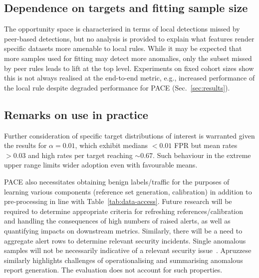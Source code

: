 \subsection{Dependence on targets and fitting sample size}
The opportunity space is characterised in terms of local detections missed by peer-based detections, but no analysis is provided to explain what features render specific datasets more amenable to local rules. While it may be expected that more samples used for fitting may detect more anomalies, only the subset missed by peer rules leads to lift at the top level. Experiments on fixed cohort sizes show this is not always realised at the end-to-end metric, e.g., increased performance of the local rule despite degraded performance for PACE (Sec.~\ref{sec:results}).

\subsection{Remarks on use in practice} 
Further consideration of specific target distributions of interest is warranted given the results for $\alpha=0.01$, which exhibit medians $<0.01$ FPR but mean rates $>0.03$ and high rates per target reaching $\sim 0.67$. Such behaviour in the extreme upper range limits wider adoption even with favourable means.

PACE also necessitates obtaining benign labels/traffic for the purposes of learning various components (reference set generation, calibration) in addition to pre-processing in line with Table~\ref{tab:data-access}. Future research will be required to determine appropriate criteria for refreshing references/calibration and handling the consequences of high numbers of raised alerts, as well as quantifying impacts on downstream metrics. Similarly, there will be a need to aggregate alert rows to determine relevant security incidents. Single anomalous samples will not be necessarily indicative of a relevant security issue~\cite{sommer2010closed}. Apruzzese~\cite{apruzzese2026sok} similarly highlights challenges of operationalising and summarising anomalous report generation. The evaluation does not account for such properties.